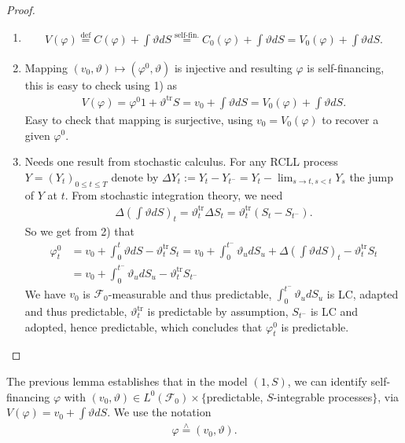 \documentclass[12pt,a4paper, twoside]{article}
\theoremstyle{definition}
\newcommand{\teq}{\overset{\wedge}{=}}
\begin{document}
\begin{proof} \
\begin{enumerate}
\item 
\begin{align*}
V( \varphi)\overset{\text{def}}=C( \varphi) + \int \vartheta dS \overset{\text{self-fin.}}= C_0( \varphi) + \int \vartheta dS = V_0( \varphi) + \int \vartheta dS. 
\end{align*}
\item Mapping $(v_0, \vartheta) \mapsto ( \varphi^0, \vartheta)$ is injective and resulting $\varphi$ is self-financing, this is easy to check using 1) as 
\begin{align*}
V( \varphi) = \varphi^0 1 + \vartheta^{\text{tr}}S = v_0 + \int \vartheta dS = V_0( \varphi) + \int \vartheta dS. 
\end{align*}
Easy to check that mapping is surjective, using $v_0=V_0( \varphi)$ to recover a given $\varphi^0$. 
\item Needs one result from stochastic calculus. For any RCLL process $Y=(Y_t)_{0 \leq t \leq T}$ denote by $\Delta Y_t := Y_t -Y_{t^-} = Y_t - \lim_{s \to t, s <t} Y_s$ the jump of $Y$ at $t$. From stochastic integration theory, we need 
\begin{align*}
\Delta \left( \int \vartheta dS\right)_t = \vartheta_t^{\text{tr}} \Delta S_t = \vartheta_t^{\text{tr}}(S_t-S_{t^-}).
\end{align*}
So we get from 2) that 
\begin{align*}
\varphi_t^0 &= v_0 + \int_0^t \vartheta dS - \vartheta_t^{\text{tr}} S_t 
= v_0 + \int_0^{t^-} \vartheta_u dS_u + \Delta \left( \int \vartheta dS\right)_t - \vartheta_t^{\text{tr}} S_t \\
&= v_0 + \int_0^{t^-} \vartheta_u dS_u - \vartheta_t^{\text{tr}} S_{t^-}
\end{align*}
We have $v_0$ is $\mathcal{F}_0$-measurable and thus predictable, $\int_0^{t^-} \vartheta_u dS_u$ is LC, adapted and thus predictable, $\vartheta_t^{\text{tr}}$ is predictable by assumption, $S_{t^-}$ is LC and adopted, hence predictable, which concludes that $\varphi_t^0$ is predictable. 
\end{enumerate}
\end{proof}
The previous lemma establishes that in the model $(1,S)$, we can identify self-financing $\varphi$ with $(v_0, \vartheta) \in L^0( \mathcal{F}_0) \times \{$predictable, $S$-integrable processes$\}$, via $V( \varphi)= v_0 + \int \vartheta d S$. We use the notation
\begin{align*}
\varphi \teq (v_0, \vartheta).
\end{align*}
\end{document}
